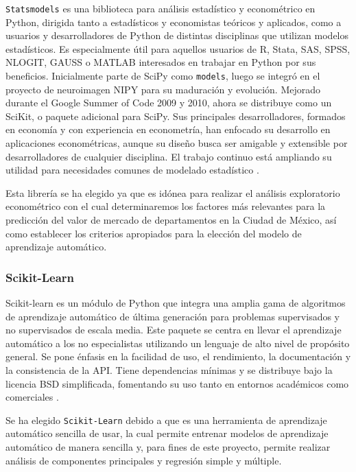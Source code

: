 \texttt{Statsmodels} es una biblioteca para análisis estadístico y econométrico
en Python, dirigida tanto a estadísticos y economistas teóricos y aplicados,
como a usuarios y desarrolladores de Python de distintas disciplinas que utilizan
modelos estadísticos. Es especialmente útil para aquellos usuarios de R, Stata,
SAS, SPSS, NLOGIT, GAUSS o MATLAB interesados en trabajar en Python por sus beneficios.
Inicialmente parte de SciPy como \texttt{models}, luego se integró en el proyecto
de neuroimagen NIPY para su maduración y evolución. Mejorado durante el
Google Summer of Code 2009 y 2010, ahora se distribuye como un SciKit, o paquete
adicional para SciPy. Sus principales desarrolladores, formados en economía y
con experiencia en econometría, han enfocado su desarrollo en aplicaciones
econométricas, aunque su diseño busca ser amigable y extensible por desarrolladores
de cualquier disciplina. El trabajo continuo está ampliando su utilidad para
necesidades comunes de modelado estadístico \cite{seabold2010statsmodels}.

Esta librería se ha elegido ya que es idónea para realizar el análisis exploratorio
econométrico con el cual determinaremos los factores más relevantes para la
predicción del valor de mercado de departamentos en la Ciudad de México, así como
establecer los criterios apropiados para la elección del modelo de aprendizaje
automático.

\subsubsection{Scikit-Learn}

Scikit-learn es un módulo de Python que integra una amplia gama de algoritmos
de aprendizaje automático de última generación para problemas supervisados y no
supervisados de escala media. Este paquete se centra en llevar el aprendizaje
automático a los no especialistas utilizando un lenguaje de alto nivel de propósito
general. Se pone énfasis en la facilidad de uso, el rendimiento, la documentación
y la consistencia de la API. Tiene dependencias mínimas y se distribuye bajo la
licencia BSD simplificada, fomentando su uso tanto en entornos académicos como
comerciales \cite{pedregosa2011scikit}.

Se ha elegido \texttt{Scikit-Learn} debido a que es una herramienta de aprendizaje
automático sencilla de usar, la cual permite entrenar modelos de aprendizaje
automático de manera sencilla y, para fines de este proyecto, permite realizar
análisis de componentes principales y regresión simple y múltiple.

